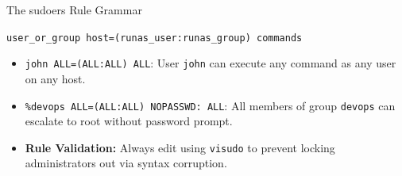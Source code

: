 \begin{cheatbox}{The sudoers Rule Grammar}
\begin{center}
\texttt{user\_or\_group \quad host=(runas\_user:runas\_group) \quad commands}
\end{center}
\begin{itemize}[leftmargin=1.5em]
    \item \texttt{john ALL=(ALL:ALL) ALL}: User \texttt{john} can execute any command as any user on any host.
    \item \texttt{\%devops ALL=(ALL:ALL) NOPASSWD: ALL}: All members of group \texttt{devops} can escalate to root without password prompt.
    \item \textbf{Rule Validation:} Always edit using \texttt{visudo} to prevent locking administrators out via syntax corruption.
\end{itemize}
\end{cheatbox}
